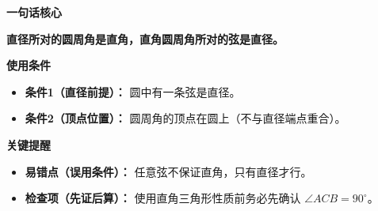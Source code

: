 \begin{summarybox}
	\textbf{\textcolor{CSummary}{一句话核心}}

	\textbf{直径所对的圆周角是直角，直角圆周角所对的弦是直径。}

	\medskip
	\textbf{\textcolor{CSummary}{使用条件}}
	\begin{itemize}[leftmargin=*, itemsep=0.5em, topsep=0.4em]
		\item \textbf{条件1（直径前提）：} 圆中有一条弦是直径。
		\item \textbf{条件2（顶点位置）：} 圆周角的顶点在圆上（不与直径端点重合）。
	\end{itemize}

	\medskip
	\textbf{\textcolor{CSummary}{关键提醒}}
	\begin{itemize}[leftmargin=*, itemsep=0.5em, topsep=0.4em]
		\item \textbf{易错点（误用条件）：} 任意弦不保证直角，只有直径才行。
		\item \textbf{检查项（先证后算）：} 使用直角三角形性质前务必先确认 $\angle ACB=90^\circ$。
	\end{itemize}
\end{summarybox}
